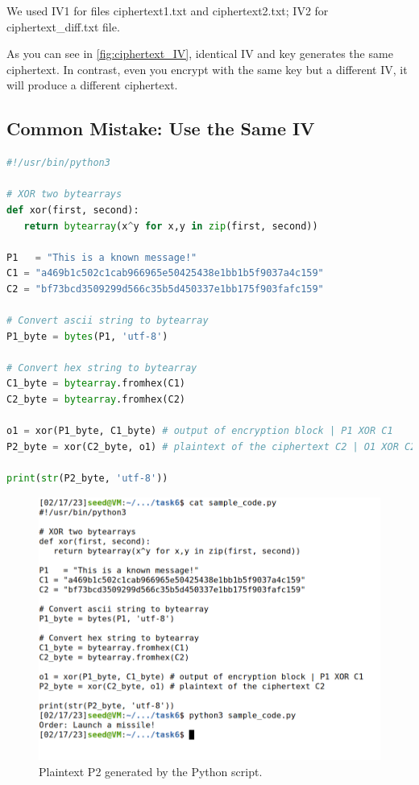 We used IV1 {} for files
{\selectfont ciphertext1.txt and ciphertext2.txt}; 
IV2 {} for
{\selectfont ciphertext\_diff.txt} file.

As you can see in \autoref{fig:ciphertext_IV}, identical IV and key generates the same
ciphertext. In contrast, even you encrypt with the same key but a different IV, it
will produce a different ciphertext.

\subsection{Common Mistake: Use the Same IV}
%
\begin{lstlisting}[language=python, caption=A script that finds
    the orginal text P2 (OFB mode).]
#!/usr/bin/python3

# XOR two bytearrays
def xor(first, second):
   return bytearray(x^y for x,y in zip(first, second))

P1   = "This is a known message!"
C1 = "a469b1c502c1cab966965e50425438e1bb1b5f9037a4c159"
C2 = "bf73bcd3509299d566c35b5d450337e1bb175f903fafc159"

# Convert ascii string to bytearray
P1_byte = bytes(P1, 'utf-8')

# Convert hex string to bytearray
C1_byte = bytearray.fromhex(C1)
C2_byte = bytearray.fromhex(C2)

o1 = xor(P1_byte, C1_byte) # output of encryption block | P1 XOR C1
P2_byte = xor(C2_byte, o1) # plaintext of the ciphertext C2 | O1 XOR C2

print(str(P2_byte, 'utf-8'))
\end{lstlisting}

\begin{figure}
    \centering
    \includegraphics[height=\textheight,width=\textwidth,keepaspectratio]
    {figures/same_IV_OFB.png}
    \caption{Plaintext P2 generated by the Python script.}
    \label{fig:p2_script}
\end{figure}

